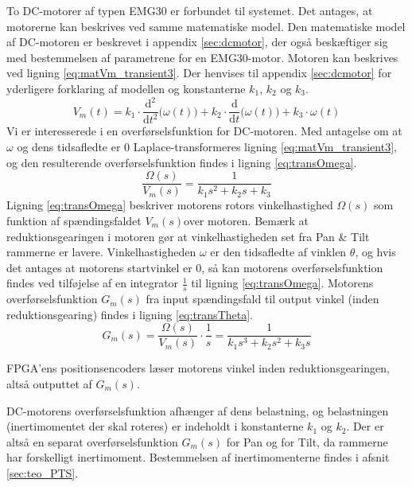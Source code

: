 To DC-motorer af typen EMG30 er forbundet til systemet.
Det antages, at motorerne kan beskrives ved samme matematiske model.
Den matematiske model af DC-motoren er beskrevet i appendix \ref{sec:dcmotor},
der også beskæftiger sig med bestemmelsen af parametrene for en EMG30-motor.
Motoren kan beskrives ved ligning \ref{eq:matVm_transient3}. Der henvises til appendix \ref{sec:dcmotor}
for yderligere forklaring af modellen og konstanterne \(k_1\), \(k_2\) og \(k_3\).
\begin{equation}
	V_m\left(t\right)=k_1\cdot{}\frac{\mathrm d^2}{\mathrm d t^2} \big(\omega\left(t\right) \big)
		+k_2\cdot{}\frac{\mathrm d}{\mathrm d t} \big(\omega\left(t\right) \big)
		+k_3\cdot{}\omega\left(t\right)
	\label{eq:matVm_transient3}
 \end{equation}
Vi er interesserede i en overførselsfunktion for DC-motoren. Med antagelse om at \(\omega\) og dens tidsafledte er 0
Laplace-transformeres ligning \ref{eq:matVm_transient3}, og den resulterende overførselsfunktion findes
i ligning \ref{eq:transOmega}.
\begin{equation}
	\frac{\Omega\left(s\right)}{V_m\left(s\right)}=\frac{1}{k_1s^2+k_2s+k_3}
	\label{eq:transOmega}
 \end{equation}
Ligning \ref{eq:transOmega} beskriver motorens rotors vinkelhastighed \(\Omega\left(s\right)\) som funktion af spændingsfaldet
\(V_m\left(s\right)\)over motoren. Bemærk at reduktionsgearingen i motoren gør at vinkelhastigheden set fra Pan \& Tilt rammerne
er lavere.
Vinkelhastigheden \(\omega\) er den tidsafledte af vinklen \(\theta\),
og hvis det antages at motorens startvinkel er 0, så kan motorens overførselsfunktion
findes ved tilføjelse af en integrator \(\frac{1}{s}\) til ligning \ref{eq:transOmega}.
Motorens overførselsfunktion \(G_m\left(s\right)\) fra input spændingsfald til output vinkel (inden reduktionsgearing) findes
i ligning \ref{eq:transTheta}.
\begin{equation}
	G_m\left(s\right)=\frac{\Omega\left(s\right)}{V_m\left(s\right)}\cdot{}\frac{1}{s}=\frac{1}{k_1s^3+k_2s^2+k_3s}
	\label{eq:transTheta}
\end{equation}

FPGA'ens positionsencoders læser motorens vinkel inden reduktionsgearingen,
altså outputtet af \(G_m\left(s\right)\).

DC-motorens overførselsfunktion afhænger af dens belastning,
og belastningen (inertimomentet der skal roteres) er indeholdt i konstanterne \(k_1\) og \(k_2\).
Der er altså en separat overførselsfunktion \(G_m\left(s\right)\) for Pan og for Tilt,
da rammerne har forskelligt inertimoment. Bestemmelsen af inertimomenterne findes i afsnit \ref{sec:teo_PTS}.

